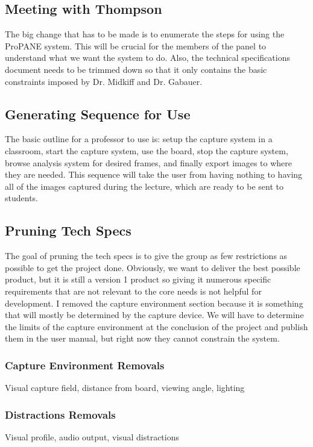 \documentclass[]{article}
\begin{document}
		\subsection{Meeting with Thompson}
			The big change that has to be made is to enumerate the steps for using the ProPANE system. This will be crucial for the members of the panel to understand what we want the system to do. Also, the technical specifications document needs to be trimmed down so that it only contains the basic constraints imposed by Dr. Midkiff and Dr. Gabauer. 
			
		\subsection{Generating Sequence for Use}
			The basic outline for a professor to use is: setup the capture system in a classroom, start the capture system, use the board, stop the capture system, browse analysis system for desired frames, and finally export images to where they are needed. This sequence will take the user from having nothing to having all of the images captured during the lecture, which are ready to be sent to students. 
			
		\subsection{Pruning Tech Specs}
			The goal of pruning the tech specs is to give the group as few restrictions as possible to get the project done. Obviously, we want to deliver the best possible product, but it is still a version 1 product so giving it numerous specific requirements that are not relevant to the core needs is not helpful for development. I removed the capture environment section because it is something that will mostly be determined by the capture device. We will have to determine the limits of the capture environment at the conclusion of the project and publish them in the user manual, but right now they cannot constrain the system. 
			
			\subsubsection{Capture Environment Removals}
				Visual capture field, distance from board, viewing angle, lighting
				
			\subsubsection{Distractions Removals}
				Visual profile, audio output, visual distractions
				
\end{document}
